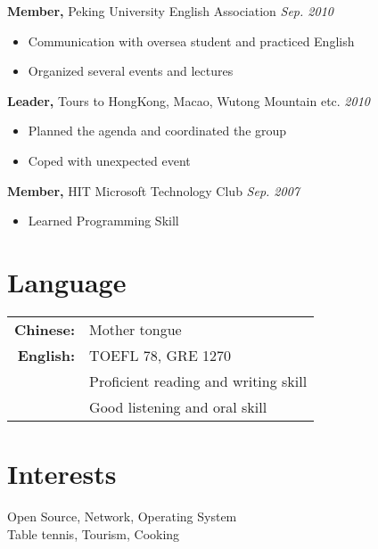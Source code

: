 \documentclass[margin]{res}
\newcommand\formatdata[1]{\textsl{\textsf{#1}}}
\begin{document}
\begin{resume}
\textbf{Member,} Peking University English Association
\hfill \formatdata{Sep. 2010}
\begin{itemize} \itemsep -2pt
    \item Communication with oversea student and practiced English
    \item Organized several events and lectures
\end{itemize}
\vspace{-8pt}
\textbf{Leader,} Tours to HongKong, Macao, Wutong Mountain etc. 
\hfill \formatdata{2010} 
\begin{itemize} \itemsep -2pt
    \item Planned the agenda and coordinated the group
    \item Coped with unexpected event
\end{itemize}
\vspace{-8pt}
\textbf{Member,} HIT Microsoft Technology Club
\hfill \formatdata{Sep. 2007}
\begin{itemize} \itemsep -2pt
    \item Learned Programming Skill
\end{itemize}

\section{Language}
\begin{tabular}{rl}
    \textbf{Chinese:} & Mother tongue \\
    \textbf{English:} & TOEFL 78, GRE 1270 \\
    & Proficient reading and writing skill\\
    & Good listening and oral skill\\
\end{tabular}
\vspace{-5pt}

\section{Interests}
Open Source, Network, Operating System \\
Table tennis, Tourism, Cooking

\end{resume} 
\end{document}
